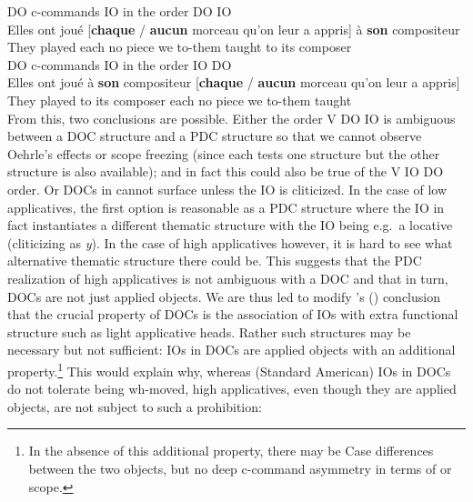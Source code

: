 \documentclass[output=paper]{langsci/langscibook}
\begin{document}
\ea \label{doio26}
\ea  DO c-commands IO in the order DO IO\\
\gll Elles ont  jou\'{e} [{\bf chaque} / {\bf aucun} morceau qu'on leur a appris] \`{a} {\bf son} compositeur\\
They {} played  each {} no piece we to-them {} taught to its composer\\
\ex  DO c-commands IO in the order IO DO\\
\gll Elles  ont jou\'{e}  \`{a} {\bf son} compositeur [\textbf{chaque} / \textbf{aucun} morceau qu'on leur a appris]\\
They {} played   to its composer each {} no piece we to-them {} taught\\
\z
\z
%
From this, two conclusions are possible. Either the order V DO IO is ambiguous
between a \gls{DOC} structure and a \gls{PDC} structure so that we cannot
observe Oehrle's effects or scope freezing (since each tests one structure but
the other structure is also available); and in fact this could also be true of
the V IO DO order. Or \glspl{DOC} in  cannot surface unless the IO is
cliticized. In the case of low applicatives, the first option is reasonable as
a \gls{PDC} structure where the IO in fact instantiates a different thematic
structure with the IO being e.g.\ a locative (cliticizing as {\it y}). In the
case of high applicatives however, it is hard to see what alternative thematic
structure there could be. This suggests that the \gls{PDC} realization of high
applicatives is not ambiguous with a \gls{DOC} and that in turn, \glspl{DOC}
are not just applied objects. We are thus led to modify
\citeauthor{anagnostopoulou2005cross}'s (\citeyear{anagnostopoulou2005cross})
conclusion that the crucial  property of \glspl{DOC} is  the association of
\glspl{IO} with extra functional structure such  as light applicative heads.
Rather such structures may be necessary but not sufficient: \glspl{IO} in
\glspl{DOC} are applied objects with an additional property.\footnote{In the
absence of this additional property, there may be Case differences between the
two objects, but no deep c-command asymmetry in terms of  or scope.}
This would explain why, whereas (Standard American)  \glspl{IO} in
\glspl{DOC} do not tolerate being wh-moved, high applicatives, even though they
are applied objects, are not subject to such a prohibition:
\end{document}
